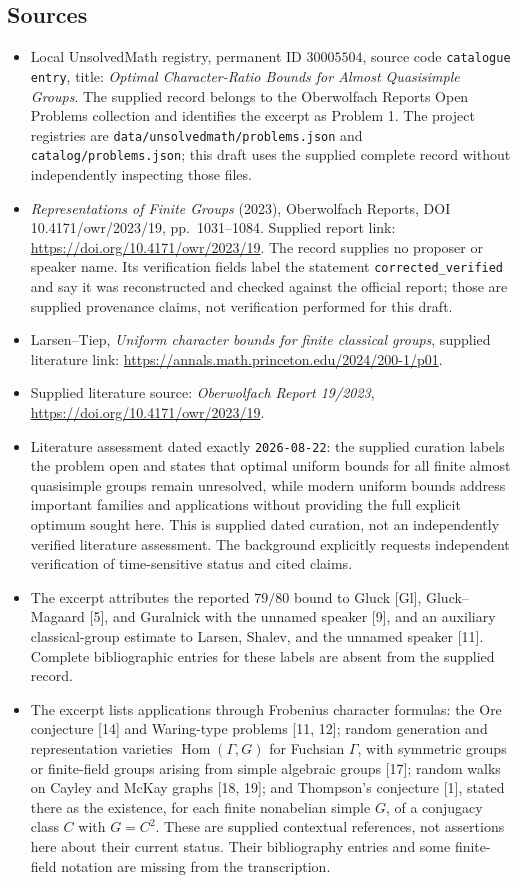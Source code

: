 \documentclass[11pt]{article}
\begin{document}
\subsection{Sources}
\begin{itemize}
\item Local UnsolvedMath registry, permanent ID \(30005504\), source code \texttt{catalogue entry}, title: \emph{Optimal Character-Ratio Bounds for Almost Quasisimple Groups}. The supplied record belongs to the Oberwolfach Reports Open Problems collection and identifies the excerpt as Problem 1. The project registries are \texttt{data/unsolvedmath/problems.json} and \texttt{catalog/problems.json}; this draft uses the supplied complete record without independently inspecting those files.
\item \emph{Representations of Finite Groups} (2023), Oberwolfach Reports, DOI 10.4171/owr/2023/19, pp.\ 1031--1084. Supplied report link: \url{https://doi.org/10.4171/owr/2023/19}. The record supplies no proposer or speaker name. Its verification fields label the statement \texttt{corrected\_verified} and say it was reconstructed and checked against the official report; those are supplied provenance claims, not verification performed for this draft.
\item Larsen--Tiep, \emph{Uniform character bounds for finite classical groups}, supplied literature link: \url{https://annals.math.princeton.edu/2024/200-1/p01}.
\item Supplied literature source: \emph{Oberwolfach Report 19/2023}, \url{https://doi.org/10.4171/owr/2023/19}.
\item Literature assessment dated exactly \texttt{2026-08-22}: the supplied curation labels the problem open and states that optimal uniform bounds for all finite almost quasisimple groups remain unresolved, while modern uniform bounds address important families and applications without providing the full explicit optimum sought here. This is supplied dated curation, not an independently verified literature assessment. The background explicitly requests independent verification of time-sensitive status and cited claims.
\item The excerpt attributes the reported \(79/80\) bound to Gluck [Gl], Gluck--Magaard [5], and Guralnick with the unnamed speaker [9], and an auxiliary classical-group estimate to Larsen, Shalev, and the unnamed speaker [11]. Complete bibliographic entries for these labels are absent from the supplied record.
\item The excerpt lists applications through Frobenius character formulas: the Ore conjecture [14] and Waring-type problems [11, 12]; random generation and representation varieties \(\operatorname{Hom}(\Gamma,G)\) for Fuchsian \(\Gamma\), with symmetric groups or finite-field groups arising from simple algebraic groups [17]; random walks on Cayley and McKay graphs [18, 19]; and Thompson's conjecture [1], stated there as the existence, for each finite nonabelian simple \(G\), of a conjugacy class \(C\) with \(G=C^2\). These are supplied contextual references, not assertions here about their current status. Their bibliography entries and some finite-field notation are missing from the transcription.
\end{itemize}
\end{document}
